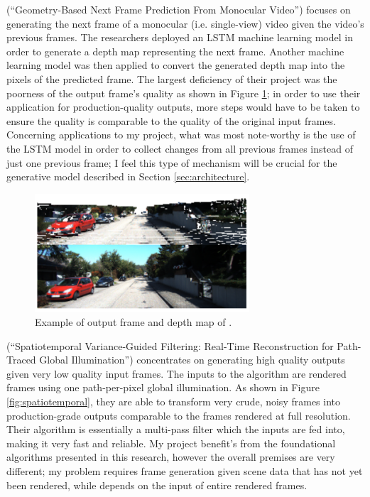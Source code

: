 \documentclass[conference]{IEEEtran}
\begin{document}
\cite{ref:frame_prediction} (``Geometry-Based Next Frame Prediction From
Monocular Video'') focuses on generating the
next frame of a monocular (i.e. single-view) video 
given the video's previous frames. The researchers deployed
an LSTM machine learning model in order to generate a depth map representing the next frame.
Another machine learning model was then applied to convert the generated depth
map into the pixels of the predicted frame. The largest deficiency of their
project was the poorness of the output frame's quality as shown in Figure
\ref{fig:frame_prediction}; in order to use their
application for production-quality outputs, more steps would have
to be taken to ensure the quality is comparable to the quality of the original input frames.
Concerning applications to my
project, what was most note-worthy is the use of the LSTM model in order to
collect changes from all previous frames instead of just one previous frame;
I feel this type of mechanism will be
crucial for the generative model described in Section \ref{sec:architecture}.

\begin{figure}[htbp]
\centerline{\includegraphics[width=8cm]{frame_prediction.png}}
\caption{Example of output frame and depth map of \cite{ref:frame_prediction}.}
\label{fig:frame_prediction}
\end{figure}

\cite{ref:spatiotemporal} (``Spatiotemporal Variance-Guided Filtering: Real-Time Reconstruction for
Path-Traced Global Illumination'') concentrates on
generating high quality outputs given very low quality input
frames. The inputs to the algorithm are rendered frames using one path-per-pixel global
illumination. As shown in Figure \ref{fig:spatiotemporal}, they are able to
transform very crude, noisy frames into production-grade outputs comparable to
the frames rendered at full resolution. Their algorithm is essentially a
multi-pass filter which the inputs are fed into, making it very fast and
reliable. My project benefit's from the foundational algorithms presented in
this research, however the overall premises are very different; my problem
requires frame generation given scene data that has not yet been rendered,
while \cite{ref:spatiotemporal} depends on the input of entire rendered frames.
\end{document}
